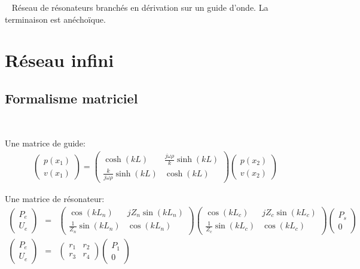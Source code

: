 \documentclass[12pt,notes=show]{beamer} %
\begin{document}
\begin{frame}{~}
Réseau de résonateurs branchés en dérivation sur un guide d'onde. La terminaison est anéchoïque.
	
\end{frame}


\section{Réseau infini}

\subsection{Formalisme matriciel}
\begin{frame}{~}
\begingroup \tiny
\begin{block}{Une matrice de guide:}
		\centering
	\begin{eqnarray*}
	\begin{pmatrix} p(x_1) \\ v(x_1) \end{pmatrix} = \begin{pmatrix} \cosh(kL) & \frac{j\omega\rho}{k} \sinh(k L) \\  \frac{k}{j\omega\rho}\sinh(k L) & \cosh(k L) 		\end{pmatrix} 	\begin{pmatrix} p(x_2) \\ v(x_2) \end{pmatrix}
	\end{eqnarray*}
\end{block}


\begin{block}{Une matrice de résonateur:}
\centering
\begin{eqnarray*}
\begin{pmatrix} P_e \\U_e \end{pmatrix}&=&\begin{pmatrix} \cos(k L_n) & j Z_{n} \sin(k L_n) \\ \frac{1}{Z_{n}} \sin(k L_n) & \cos(k L_n) \end{pmatrix} \begin{pmatrix} \cos(k L_c) & j Z_{c} \sin(k L_c) \\ \frac{1}{Z_{c}} \sin(k L_c) & \cos(k L_c) \end{pmatrix} \begin{pmatrix} P_s \\ 0  \end{pmatrix} \\
\begin{pmatrix} P_e \\U_e \end{pmatrix}&=&\begin{pmatrix} r_1 & r_2 \\ r_3 & r_4 \end{pmatrix} \begin{pmatrix} P_1 \\ 0  \end{pmatrix} 
\end{eqnarray*}
\end{block}
\endgroup


\end{frame}
\end{document}
